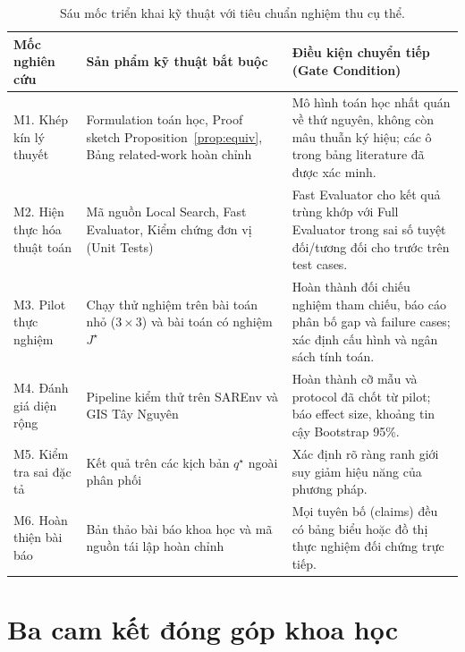 \documentclass[12pt,a4paper]{article}
\begin{document}
\begin{table}[H]
\centering
\caption{Sáu mốc triển khai kỹ thuật với tiêu chuẩn nghiệm thu cụ thể.}
\label{tab:milestones}
\small
\begin{tabular}{@{}p{3.2cm}p{4.8cm}p{5.5cm}@{}}
\toprule
\textbf{Mốc nghiên cứu} & \textbf{Sản phẩm kỹ thuật bắt buộc} & \textbf{Điều kiện chuyển tiếp (Gate Condition)} \\
\midrule
M1. Khép kín lý thuyết &
Formulation toán học, Proof sketch Proposition~\ref{prop:equiv}, Bảng related-work hoàn chỉnh &
Mô hình toán học nhất quán về thứ nguyên, không còn mâu thuẫn ký hiệu; các ô trong bảng literature đã được xác minh. \\
M2. Hiện thực hóa thuật toán &
Mã nguồn Local Search, Fast Evaluator, Kiểm chứng đơn vị (Unit Tests) &
Fast Evaluator cho kết quả trùng khớp với Full Evaluator trong sai số tuyệt đối/tương đối cho trước trên test cases. \\
M3. Pilot thực nghiệm &
Chạy thử nghiệm trên bài toán nhỏ ($3 \times 3$) và bài toán có nghiệm $J^\star$ &
Hoàn thành đối chiếu nghiệm tham chiếu, báo cáo phân bố gap và failure cases; xác định cấu hình và ngân sách tính toán. \\
M4. Đánh giá diện rộng &
Pipeline kiểm thử trên SAREnv và GIS Tây Nguyên &
Hoàn thành cỡ mẫu và protocol đã chốt từ pilot; báo effect size, khoảng tin cậy Bootstrap 95\%. \\
M5. Kiểm tra sai đặc tả &
Kết quả trên các kịch bản $q^\star$ ngoài phân phối &
Xác định rõ ràng ranh giới suy giảm hiệu năng của phương pháp. \\
M6. Hoàn thiện bài báo &
Bản thảo bài báo khoa học và mã nguồn tái lập hoàn chỉnh &
Mọi tuyên bố (claims) đều có bảng biểu hoặc đồ thị thực nghiệm đối chứng trực tiếp. \\
\bottomrule
\end{tabular}
\end{table}

\section{Ba cam kết đóng góp khoa học}
\end{document}
